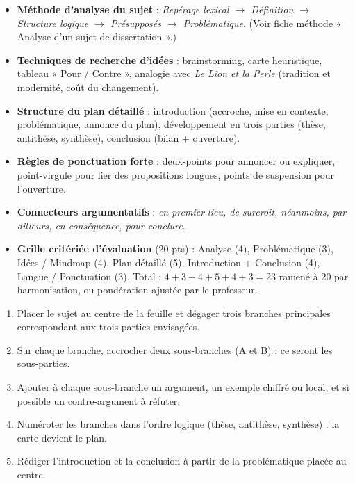 \documentclass[11pt]{article}
\newcounter{popsec}
\newcounter{popsub}
\newcommand{\courssub}[1]{%
  \stepcounter{popsub}%
  \par\vspace{9pt}\noindent{\popxbold\fontsize{11.5}{13}\selectfont\color{popink}{\color{poporange}\thepopsec.\thepopsub}\hspace{6pt}#1}\par\nopagebreak\vspace{4pt}
}
\begin{document}
\courssub{Ressources à mobiliser}
\begin{itemize}
    \item \textbf{Méthode d'analyse du sujet} : \emph{Repérage lexical $\rightarrow$ Définition $\rightarrow$ Structure logique $\rightarrow$ Présupposés $\rightarrow$ Problématique}. (Voir fiche méthode « Analyse d'un sujet de dissertation ».)
    \item \textbf{Techniques de recherche d'idées} : brainstorming, carte heuristique, tableau « Pour / Contre », analogie avec \emph{Le Lion et la Perle} (tradition et modernité, coût du changement).
    \item \textbf{Structure du plan détaillé} : introduction (accroche, mise en contexte, problématique, annonce du plan), développement en trois parties (thèse, antithèse, synthèse), conclusion (bilan + ouverture).
    \item \textbf{Règles de ponctuation forte} : deux-points pour annoncer ou expliquer, point-virgule pour lier des propositions longues, points de suspension pour l'ouverture.
    \item \textbf{Connecteurs argumentatifs} : \emph{en premier lieu, de surcroît, néanmoins, par ailleurs, en conséquence, pour conclure}.
    \item \textbf{Grille critériée d'évaluation} (20 pts) : Analyse (4), Problématique (3), Idées / Mindmap (4), Plan détaillé (5), Introduction + Conclusion (4), Langue / Ponctuation (3). Total : $4+3+4+5+4+3 = 23$ ramené à 20 par harmonisation, ou pondération ajustée par le professeur.
\end{itemize}

\begin{methode}
\begin{enumerate}
    \item Placer le sujet au centre de la feuille et dégager trois branches principales correspondant aux trois parties envisagées.
    \item Sur chaque branche, accrocher deux sous-branches (A et B) : ce seront les sous-parties.
    \item Ajouter à chaque sous-branche un argument, un exemple chiffré ou local, et si possible un contre-argument à réfuter.
    \item Numéroter les branches dans l'ordre logique (thèse, antithèse, synthèse) : la carte devient le plan.
    \item Rédiger l'introduction et la conclusion à partir de la problématique placée au centre.
\end{enumerate}
\end{methode}
\end{document}

